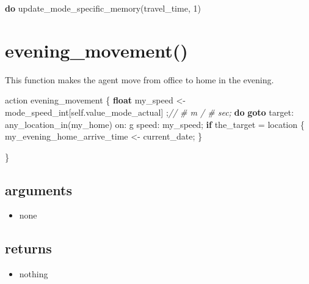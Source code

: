 \documentclass[]{book}
\newenvironment{Shaded}{\begin{snugshade}}{\end{snugshade}}
\newcommand{\CommentTok}[1]{\textcolor[rgb]{0.56,0.35,0.01}{\textit{#1}}}
\newcommand{\DecValTok}[1]{\textcolor[rgb]{0.00,0.00,0.81}{#1}}
\newcommand{\KeywordTok}[1]{\textcolor[rgb]{0.13,0.29,0.53}{\textbf{#1}}}
\newcommand{\NormalTok}[1]{#1}
\newcommand{\OtherTok}[1]{\textcolor[rgb]{0.56,0.35,0.01}{#1}}
\providecommand{\tightlist}{%
  \setlength{\itemsep}{0pt}\setlength{\parskip}{0pt}}
\theoremstyle{definition}
\theoremstyle{definition}
\theoremstyle{definition}
\theoremstyle{remark}
\begin{document}
\begin{Shaded}
\begin{Highlighting}[]
\KeywordTok{do}\NormalTok{ update_mode_specific_memory}\OtherTok{(}\NormalTok{travel_time}\OtherTok{,} \DecValTok{1}\OtherTok{)}
\end{Highlighting}
\end{Shaded}

\hypertarget{evening_movement}{%
\section{evening\_movement()}\label{evening_movement}}

This function makes the agent move from office to home in the evening.

\begin{Shaded}
\begin{Highlighting}[]
\NormalTok{action evening_movement}
\NormalTok{    \{}
        \KeywordTok{float}\NormalTok{ my_speed <- mode_speed_int}\OtherTok{[}\NormalTok{self.value_mode_actual}\OtherTok{]} \OtherTok{;}\CommentTok{// # m / # sec;}
        \KeywordTok{do} \KeywordTok{goto}\NormalTok{ target: any_location_in}\OtherTok{(}\NormalTok{my_home}\OtherTok{)}\NormalTok{ on: g speed: my_speed}\OtherTok{;}
        \KeywordTok{if}\NormalTok{ the_target = location}
\NormalTok{        \{}
\NormalTok{            my_evening_home_arrive_time <- current_date}\OtherTok{;}
\NormalTok{        \}}

\NormalTok{    \}}
\end{Highlighting}
\end{Shaded}

\hypertarget{arguments-1}{%
\subsection*{arguments}\label{arguments-1}}

\begin{itemize}
\tightlist
\item
  none
\end{itemize}

\hypertarget{returns-1}{%
\subsection*{returns}\label{returns-1}}

\begin{itemize}
\tightlist
\item
  nothing
\end{itemize}
\end{document}
